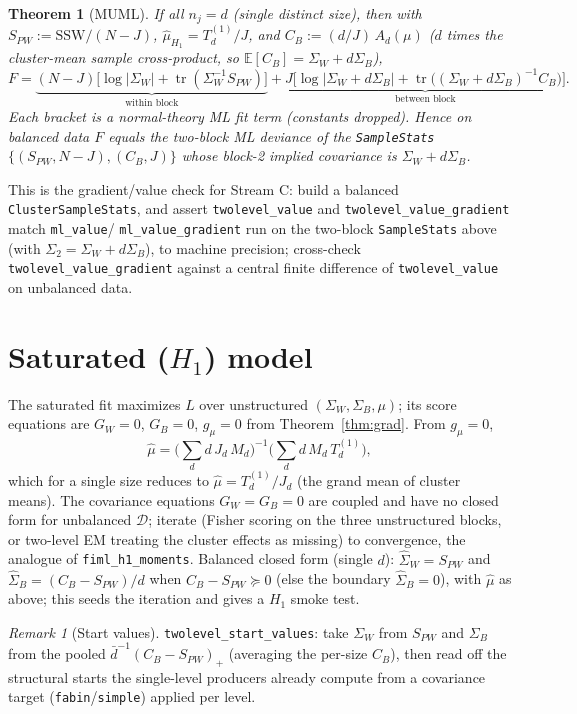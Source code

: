 \documentclass[11pt]{article}
\newcommand{\E}{\mathbb{E}}
\newcommand{\tr}{\operatorname{tr}}
\newcommand{\Sw}{\Sigma_W}
\newcommand{\Sb}{\Sigma_B}
\newcommand{\Md}{M_d}
\newcommand{\SSW}{\mathrm{SSW}}
\theoremstyle{plain}
\newtheorem{theorem}{Theorem}
\theoremstyle{remark}
\newtheorem*{remark}{Remark}
\begin{document}
\begin{theorem}[MUML]
\label{thm:muml}
If all $n_j=d$ (single distinct size), then with $S_{PW}:=\SSW/(N-J)$,
$\hat\mu_{H_1}=T^{(1)}_d/J$, and $C_B:=(d/J)\,A_d(\mu)$ ($d$ times the
cluster-mean sample cross-product, so $\E[C_B]=\Sw+d\Sb$),
\[
F=\underbrace{(N-J)\big[\log|\Sw|+\tr(\Sw^{-1}S_{PW})\big]}_{\text{within block}}
+\underbrace{J\big[\log|\Sw+d\Sb|+\tr\big((\Sw+d\Sb)^{-1}C_B\big)\big]}_{\text{between block}} .
\]
Each bracket is a normal-theory ML fit term (constants dropped). Hence on
balanced data $F$ equals the two-block ML deviance of the
\texttt{SampleStats} $\{(S_{PW},N{-}J),(C_B,J)\}$ whose block-2 implied
covariance is $\Sw+d\Sb$.
\end{theorem}

This is the gradient/value check for Stream C: build a balanced
\texttt{ClusterSampleStats}, and assert \texttt{twolevel\_value} and
\texttt{twolevel\_value\_gradient} match \texttt{ml\_value}/\allowbreak
\texttt{ml\_value\_gradient} run on the two-block \texttt{SampleStats} above
(with $\Sigma_2=\Sw+d\Sb$), to machine precision; cross-check
\texttt{twolevel\_value\_gradient} against a central finite difference of
\texttt{twolevel\_value} on unbalanced data.

\section{Saturated ($H_1$) model}
\label{sec:h1}

The saturated fit maximizes $L$ over unstructured $(\Sw,\Sb,\mu)$; its score
equations are $G_W=0$, $G_B=0$, $g_\mu=0$ from Theorem~\ref{thm:grad}. From
$g_\mu=0$,
\begin{equation}
\label{eq:muhat}
\hat\mu=\Big(\sum_d d\,J_d\,\Md\Big)^{-1}\Big(\sum_d d\,\Md\,T^{(1)}_d\Big),
\end{equation}
which for a single size reduces to $\hat\mu=T^{(1)}_d/J_d$ (the grand mean of
cluster means). The covariance equations $G_W=G_B=0$ are coupled and have no
closed form for unbalanced $\mathcal D$; iterate (Fisher scoring on the three
unstructured blocks, or two-level EM treating the cluster effects as missing)
to convergence, the analogue of \texttt{fiml\_h1\_moments}. Balanced closed
form (single $d$): $\hat\Sw=S_{PW}$ and $\hat\Sb=(C_B-S_{PW})/d$ when
$C_B-S_{PW}\succeq0$ (else the boundary $\hat\Sb=0$), with $\hat\mu$ as above;
this seeds the iteration and gives a $H_1$ smoke test.

\begin{remark}[Start values]
\texttt{twolevel\_start\_values}: take $\Sw$ from $S_{PW}$ and $\Sb$ from the
pooled $\bar d^{-1}(C_B-S_{PW})_+$ (averaging the per-size $C_B$), then read off
the structural starts the single-level producers already compute from a
covariance target (\texttt{fabin}/\texttt{simple}) applied per level.
\end{remark}
\end{document}
